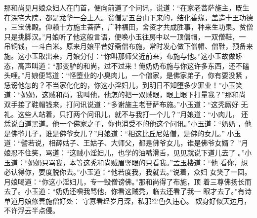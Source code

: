 那和尚见月娘众妇人在门首，便向前道了个问讯，说道：“在家老菩萨施主，既生
在深宅大院，都是龙华一会上人。贫僧是五台山下来的，结化善缘，盖造十王功德
，三宝佛殿。仰赖十方施主菩萨，广种福田，舍资才共成胜事，种来生功果。贫僧
只是挑脚汉。”月娘听了他这般言语，便唤小玉往房中以一顶僧帽，一双僧鞋，一
吊铜钱，一斗白米。原来月娘平昔好斋僧布施，常时发心做下僧帽、僧鞋，预备来
施。这小玉取出来，月娘分付：“你叫那师父近前来，布施与他。”这小玉故做娇
态，高声叫道：“那变驴的和尚，过不过来！俺奶奶布施与你这许多东西，还不磕
头哩。”月娘便骂道：“怪堕业的小臭肉儿，一个僧家，是佛家弟子，你有要没紧
，恁谤他怎的？不当家化化的，你这小淫妇儿，到明日不知堕多少罪业！”小玉笑
道：“奶奶，这贼和尚，我叫他，他怎的把一双贼眼，眼上眼下打量我？”那和尚
双手接了鞋帽钱来，打问讯说道：“多谢施主老菩萨布施。”小玉道：“这秃厮好
无礼。这些人站着，只打两个问讯儿，就不与我打一个儿？”月娘道：“小肉儿，
还恁说白道黑道。他一个佛家之子，你也消受不的他这个问讯。”小玉道：“奶奶
，他是佛爷儿子，谁是佛爷女儿？”月娘道：“相这比丘尼姑僧，是佛的女儿。”
小玉道：“譬若说，相薛姑子、王姑子、大师父，都是佛爷女儿，谁是佛爷女婿？
”月娘忍不住笑，骂道：“这贼小淫妇儿，也学的油嘴滑舌，见见就说下道儿去了
。”小玉道：“奶奶只骂我，本等这秃和尚贼眉竖眼的只看我。”孟玉楼道：“他
看你，想必认得你，要度脱你去。”小玉道：“他若度我，我就去。”说着，众妇
女笑了一回。月娘喝道：“你这小淫妇儿，专一毁僧谤佛。”那和尚得了布施，顶
着三尊佛扬长而去了。小玉道：“奶奶还嗔我骂他，你看这贼秃，临去还看了我一
眼才去了。”有诗单道月娘修善施僧好处：
守寡看经岁月深，私邪空色久违心。
奴身好似天边月，不许浮云半点侵。

